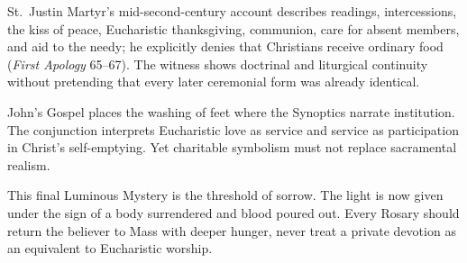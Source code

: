 St.~Justin Martyr's mid-second-century account describes readings, intercessions, the kiss of peace, Eucharistic thanksgiving, communion, care for absent members, and aid to the needy; he explicitly denies that Christians receive ordinary food (\emph{First Apology} 65--67). The witness shows doctrinal and liturgical continuity without pretending that every later ceremonial form was already identical.

John's Gospel places the washing of feet where the Synoptics narrate institution. The conjunction interprets Eucharistic love as service and service as participation in Christ's self-emptying. Yet charitable symbolism must not replace sacramental realism.

This final Luminous Mystery is the threshold of sorrow. The light is now given under the sign of a body surrendered and blood poured out. Every Rosary should return the believer to Mass with deeper hunger, never treat a private devotion as an equivalent to Eucharistic worship.
